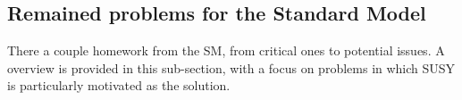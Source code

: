 




%
%
\clearpage
\subsection{Remained problems for the Standard Model}
There a couple homework from the SM, from critical ones to potential issues.
A overview is provided in this sub-section, with a focus on problems in which SUSY is particularly motivated as the solution.


